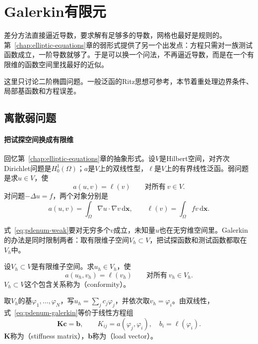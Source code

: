 \section{Galerkin有限元}
\label{sec:pdenum-galerkin}

差分方法直接逼近导数，要求解有足够多的导数，网格也最好是规则的。第~\ref{chap:elliptic-equations}章的弱形式提供了另一个出发点：方程只需对一族测试函数成立，一阶导数就够了。于是可以换一个问法，不再逼近导数，而是在一个有限维的函数空间里找最好的近似。

这里只讨论二阶椭圆问题。一般泛函的Ritz思想可参考，本节着重处理边界条件、局部基函数和方程误差。

\subsection{离散弱问题}
\label{sec:pdenum-weak-galerkin}

\paragraph{把试探空间换成有限维}
回忆第~\ref{chap:elliptic-equations}章的抽象形式。设$V$是Hilbert空间，对齐次Dirichlet问题是$H^1_0(\Omega)$；$a$是$V$上的双线性型，$\ell$是$V$上的有界线性泛函。弱问题是求$u\in V$，使
\begin{equation}
 a(u,v)=\ell(v)\qquad\text{对所有}\ v\in V .
 \label{eq:pdenum-weak}
\end{equation}
对问题$-\Delta u=f$，两个对象分别是
\[
 a(u,v)=\int_\Omega\nabla u\cdot\nabla v\,\mathrm{d}\bm{x},\qquad \ell(v)=\int_\Omega fv\,\mathrm{d}\bm{x}.
\]

式~\eqref{eq:pdenum-weak}要对无穷多个$v$成立，未知量$u$也在无穷维空间里。Galerkin的办法是同时限制两者：取有限维子空间$V_h\subset V$，把试探函数和测试函数都取在$V_h$中。

\begin{definition}[Galerkin方程]
 \label{def:pdenum-galerkin}
 设$V_h\subset V$是有限维子空间。求$u_h\in V_h$，使
 \begin{equation}
  a(u_h,v_h)=\ell(v_h)\qquad\text{对所有}\ v_h\in V_h .
  \label{eq:pdenum-galerkin}
 \end{equation}
 $V_h\subset V$这个包含关系称为（conformity）。
\end{definition}

取$V_h$的基$\varphi_1,\ldots,\varphi_N$，写$u_h=\sum_jc_j\varphi_j$，并依次取$v_h=\varphi_i$。由双线性，式~\eqref{eq:pdenum-galerkin}等价于线性方程组
\begin{equation}
 \bm{K}\bm{c}=\bm{b},\qquad K_{ij}=a(\varphi_j,\varphi_i),\quad b_i=\ell(\varphi_i).
 \label{eq:pdenum-stiffness-system}
\end{equation}
$\bm{K}$称为（stiffness matrix），$\bm{b}$称为（load vector）。

